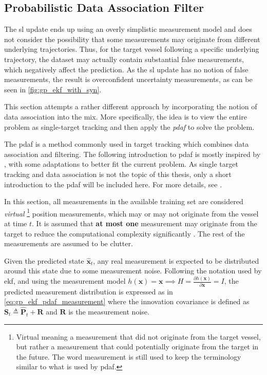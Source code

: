 \subsection{Probabilistic Data Association Filter}
The \acrshort{sl} update ends up using an overly simplistic measurement model and does not consider the possibility that some measurements may originate from different underlying trajectories. Thus, for the target vessel following a specific underlying trajectory, the dataset may actually contain substantial false measurements, which negatively affect the prediction. As the \acrshort{sl} update has no notion of false measurements, the result is overconfident uncertainty measurements, as can be seen in \cref{fig:gp_ekf_with_syn}.

This section attempts a rather different approach by incorporating the notion of data association into the mix. More specifically, the idea is to view the entire problem as single-target tracking and then apply the \textit{\acrfull{pdaf}} to solve the problem.

The \acrshort{pdaf} is a method commonly used in target tracking which combines data association and filtering. The following introduction to \acrshort{pdaf} is mostly inspired by \cite{sensorfusjon}, with some adaptations to better fit the current problem. As single target tracking and data association is not the topic of this thesis, only a short introduction to the \acrshort{pdaf} will be included here. For more details, see \cite{sensorfusjon,bar1995multitarget}.

In this section, all measurements in the available training set are considered \textit{virtual} \footnote{Virtual meaning a measurement that did not originate from the target vessel, but rather a measurement that could potentially originate from the target in the future. The word measurement is still used to keep the terminology similar to what is used by \acrshort{pdaf}.} position measurements, which may or may not originate from the vessel at time $t$. It is assumed that \textbf{at most one} measurement may originate from the target to reduce the computational complexity significantly \cite{sensorfusjon}. The rest of the measurements are assumed to be clutter.

Given the predicted state $\hat{\boldsymbol{x}}_t$, any real measurement is expected to be distributed around this state due to some measurement noise. Following the notation used by \acrshort{ekf}, and using the measurement model $h(\boldsymbol{x}) = \boldsymbol{x} \implies H = \frac{\partial h (\boldsymbol{x})}{\partial \boldsymbol{x}} = I$, the predicted measurement distribution is expressed as in \cref{eq:gp_ekf_pdaf_measurement} where the innovation covariance is defined as $\boldsymbol{S}_t \triangleq \hat{\boldsymbol{P}}_t + \boldsymbol{R}$ and $\boldsymbol{R}$ is the measurement noise.

